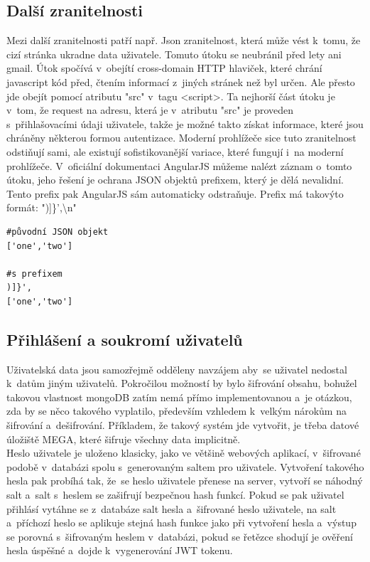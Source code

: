 \documentclass[a4paper,12pt,twoside,BCOR=10mm]{article}
\newenvironment{codeframe}{%
  \begin{Sbox} 
    \begin{minipage} 
      {\columnwidth-\leftmargin-\rightmargin-2\fboxsep-2\fboxrule-4pt} 
}{%

  \end{minipage} 
  \end{Sbox} 
  \begin{center} 
    \fcolorbox{black}{codeback}{\TheSbox} 
  \end{center} 
}
\begin{document}
\subsection{Další zranitelnosti}
Mezi další zranitelnosti patří např. Json zranitelnost, která může vést k~tomu, že cizí stránka ukradne data uživatele\cite{jsonZran}. Tomuto útoku se neubránil před lety ani gmail\cite{jsonZran2}. Útok spočívá v~obejítí cross-domain HTTP hlaviček, které chrání javascript kód před, čtením informací z~jiných stránek než byl určen. Ale přesto jde obejít pomocí atributu "src"  v~tagu <script>. Ta nejhorší část útoku je v~tom, že request na adresu, která je v~atributu "src" je proveden s~přihlašovacími údaji uživatele, takže je možné takto získat informace, které jsou chráněny některou formou autentizace. Moderní prohlížeče sice tuto zranitelnost odstiňují sami, ale existují sofistikovanější variace, které fungují i~na moderní prohlížeče\cite{jsonZran2}. V~oficiální dokumentaci AngularJS můžeme nalézt záznam o~tomto útoku, jeho řešení je ochrana JSON objektů prefixem, který je dělá nevalidní. Tento prefix pak AngularJS sám automaticky odstraňuje. Prefix má takovýto formát: ")]\}',\textbackslash n"\cite{angularHTTP}
\begin{codeframe}
  \begin{verbatim}
#původní JSON objekt
['one','two']

#s prefixem
)]}',
['one','two']
    \end{verbatim}
\end{codeframe}


\subsection{Přihlášení a soukromí uživatelů}
Uživatelská data jsou samozřejmě odděleny navzájem aby~se uživatel nedostal k~datům jiným uživatelů. Pokročilou možností by bylo šifrování obsahu, bohužel takovou vlastnost mongoDB zatím nemá přímo implementovanou a~je otázkou, zda by se něco takového vyplatilo, především vzhledem k~velkým nárokům na šifrování a~dešifrování. Příkladem, že takový systém jde vytvořit, je třeba datové úložiště MEGA, které šifruje všechny data implicitně.\\
Heslo uživatele je uloženo klasicky, jako ve většině webových aplikací, v~šifrované podobě v~databázi spolu s~generovaným saltem pro uživatele. Vytvoření takového hesla pak probíhá tak, že~se heslo uživatele přenese na server, vytvoří se náhodný salt a~salt s~heslem se zašifrují bezpečnou hash funkcí. Pokud se pak uživatel přihlásí vytáhne se z~databáze salt hesla a~šifrované heslo uživatele, na salt a~příchozí heslo se aplikuje stejná hash funkce jako při vytvoření hesla a~výstup se porovná s~šifrovaným heslem v~databázi, pokud se řetězce shodují je ověření hesla úspěšné a~dojde k~vygenerování JWT tokenu.
\end{document}
